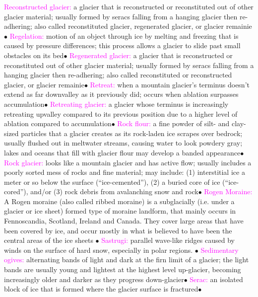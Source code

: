 \documentclass{article}
\newcommand{\ddd}{$\bullet$}
\newcommand{\pink}[1]{\textcolor{magenta}{#1}}
\newcommand{\vocab}[1]{{\pink{#1}}}
\begin{document}
\begin{multicols*}{4}
		\vocab{        Reconstructed glacier: } a glacier that is reconstructed or reconstituted out of other glacier material; usually formed by seracs falling from a hanging glacier then re-adhering; also called reconstituted glacier, regenerated glacier, or glacier remainie\ddd
		\vocab{        Regelation: } motion of an object through ice by melting and freezing that is caused by pressure differences; this process allows a glacier to slide past small obstacles on its bed\ddd
		\vocab{        Regenerated glacier: } a glacier that is reconstructed or reconstituted out of other glacier material; usually formed by seracs falling from a hanging glacier then re-adhering; also called reconstituted or reconstructed glacier, or glacier remainie\ddd
		\vocab{        Retreat: } when a mountain glacier's terminus doesn't extend as far downvalley as it previously did; occurs when ablation surpasses accumulation\ddd
		\vocab{        Retreating glacier: } a glacier whose terminus is increasingly retreating upvalley compared to its previous position due to a higher level of ablation compared to accumulation\ddd
		\vocab{        Rock flour: } a fine powder of silt- and clay-sized particles that a glacier creates as its rock-laden ice scrapes over bedrock; usually flushed out in meltwater streams, causing water to look powdery gray; lakes and oceans that fill with glacier flour may develop a banded appearance\ddd
		\vocab{        Rock glacier: } looks like a mountain glacier and has active flow; usually includes a poorly sorted mess of rocks and fine material; may include: (1) interstitial ice a meter or so below the surface (“ice-cemented”), (2) a buried core of ice (“ice-cored”), and/or (3) rock debris from avalanching snow and rock\ddd
		\vocab{        Rogen Moraine: } A Rogen moraine (also called ribbed moraine) is a subglacially (i.e. under a glacier or ice sheet) formed type of moraine landform, that mainly occurs in Fennoscandia, Scotland, Ireland and Canada. They cover large areas that have been covered by ice, and occur mostly in what is believed to have been the central areas of the ice sheets \ddd
		\vocab{        Sastrugi: } parallel wave-like ridges caused by winds on the surface of hard snow, especially in polar regions. \ddd
		\vocab{        Sedimentary ogives: } alternating bands of light and dark at the firn limit of a glacier; the light bands are usually young and lightest at the highest level up-glacier, becoming increasingly older and darker as they progress down-glacier\ddd
		\vocab{        Serac: } an isolated block of ice that is formed where the glacier surface is fractured\ddd

\end{multicols*}
\end{document}
